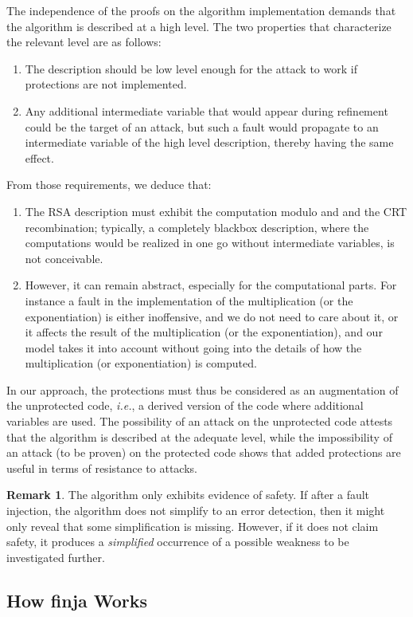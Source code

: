 \documentclass[10pt]{article}
\theoremstyle{definition}
\newtheorem{remark}{Remark}
\theoremstyle{theorem}
\newcommand{\finja}{\textsf{finja}\xspace}
\newcommand{\ie}{\textit{i.e.}}
\begin{document}
The independence of the proofs on the algorithm implementation demands that the algorithm is described at a high level.
The two properties that characterize the relevant level are as follows:

\begin{enumerate}
\item The description should be low level enough for the attack to work if protections are not implemented.
\item Any additional intermediate variable that would appear during refinement could be the target of an attack,
but such a fault would propagate to an intermediate variable of the high level description, thereby having the same effect.
\end{enumerate}
From those requirements, we deduce that:
\begin{enumerate}
\item The RSA description must exhibit the computation modulo  and  and the CRT recombination;
typically, a completely blackbox description, where the computations would be realized in one go without intermediate variables, is not conceivable.
\item However, it can remain abstract, especially for the computational parts.
For instance a fault in the implementation of the multiplication (or the exponentiation) is either inoffensive, and we do not need to care about it, or it affects the result of the multiplication (or the exponentiation), and our model takes it into account without going into the details of how the multiplication (or exponentiation) is computed.
\end{enumerate}
In our approach, the protections must thus be considered as an augmentation of the unprotected code,
\ie, a derived version of the code where additional variables are used.
The possibility of an attack on the unprotected code attests that the algorithm is described at the adequate level,
while the impossibility of an attack (to be proven) on the protected code shows that added protections are useful in terms of resistance to attacks.
\begin{remark}
The algorithm only exhibits evidence of safety.
If after a fault injection, the algorithm does not simplify to an error detection, then it might only reveal that some simplification is missing.
However, if it does not claim safety, it produces a \emph{simplified} occurrence of a possible weakness to be investigated further.
\end{remark}

\subsection{How \finja Works}
\label{sec-methods-finja}
\end{document}
